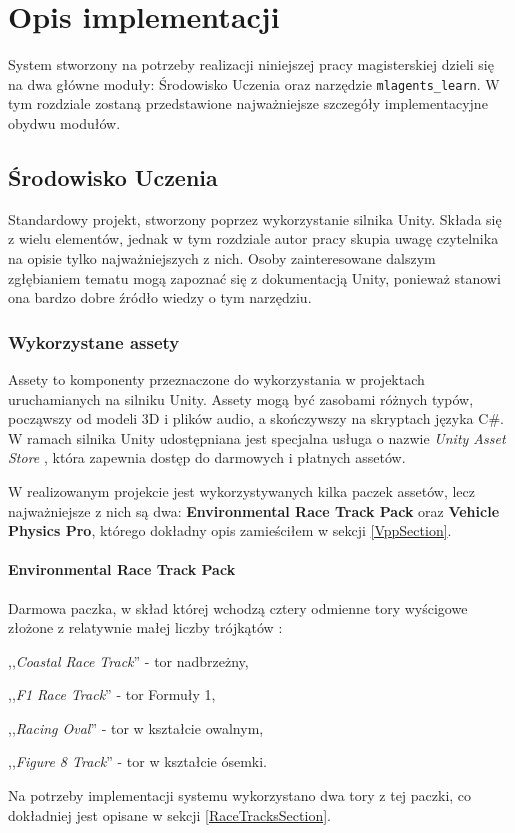\chapter{Opis implementacji}
\label{ImplementationChapter}
System stworzony na potrzeby realizacji niniejszej pracy magisterskiej dzieli się na dwa główne moduły: Środowisko Uczenia oraz narzędzie \texttt{mlagents\_learn}. W tym rozdziale zostaną przedstawione najważniejsze szczegóły implementacyjne obydwu modułów.

\section{Środowisko Uczenia}
Standardowy projekt, stworzony poprzez wykorzystanie silnika Unity. Składa się z wielu elementów, jednak w tym rozdziale autor pracy skupia uwagę czytelnika na opisie tylko najważniejszych z nich. Osoby zainteresowane dalszym zgłębianiem tematu mogą zapoznać się z dokumentacją Unity, ponieważ stanowi ona bardzo dobre źródło wiedzy o tym narzędziu.

\subsection{Wykorzystane assety}
Assety to komponenty przeznaczone do wykorzystania w projektach uruchamianych na silniku Unity. Assety mogą być zasobami różnych typów, począwszy od modeli 3D i plików audio, a skończywszy na skryptach języka C\#. W ramach silnika Unity udostępniana jest specjalna usługa o nazwie \textit{Unity Asset Store} \cite{unity:assetStore}, która zapewnia dostęp do darmowych i płatnych assetów.

W realizowanym projekcie jest wykorzystywanych kilka paczek assetów, lecz najważniejsze z nich są dwa: \textbf{Environmental Race Track Pack} oraz \textbf{Vehicle Physics Pro}, którego dokładny opis zamieściłem w sekcji \ref{VppSection}.

\subsubsection{Environmental Race Track Pack}
Darmowa paczka, w skład której wchodzą cztery odmienne tory wyścigowe złożone z relatywnie małej liczby trójkątów \cite{unityAssets:envRaceTrackPack}:
\vspace{-0.5cm}
\begin{itemize*}
\item ,,\textit{Coastal Race Track}'' - tor nadbrzeżny,
\item ,,\textit{F1 Race Track}'' - tor Formuły 1,
\item ,,\textit{Racing Oval}'' - tor w kształcie owalnym,
\item ,,\textit{Figure 8 Track}'' - tor w kształcie ósemki.
\end{itemize*}
Na potrzeby implementacji systemu wykorzystano dwa tory z tej paczki, co dokładniej jest opisane w sekcji \ref{RaceTracksSection}.

